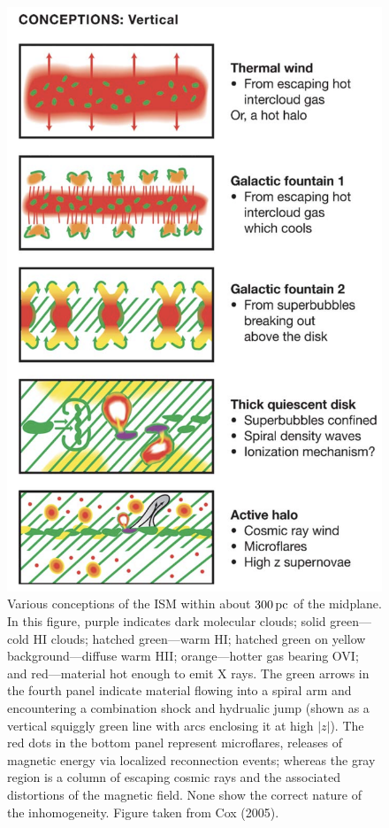 \documentclass[a4paper,10pt]{article}
\begin{document}
\begin{figure}[t!]
    \centering
    \includegraphics[width=14cm]{figures/ISM_vertical.png}
    \caption{\footnotesize{Various conceptions of the ISM within about $300\,{\rm pc}$ of the midplane. In this figure, purple indicates dark molecular clouds; solid green—cold HI clouds; hatched green—warm HI; hatched green on yellow background—diffuse warm HII; orange—hotter gas bearing OVI; and red—material hot enough to emit X rays. The green arrows in the fourth panel indicate material flowing into a spiral arm and encountering a combination shock and hydrualic jump (shown as a vertical squiggly green line with arcs enclosing it at high $|z|$). The red dots in the bottom panel represent microflares, releases of magnetic energy via localized reconnection events; whereas the gray region is a column of escaping cosmic rays and the associated distortions of the magnetic field. None show the correct nature of the inhomogeneity. Figure taken from Cox (2005).}}
    \label{fig:ISMvertical}
\end{figure}
\end{document}
